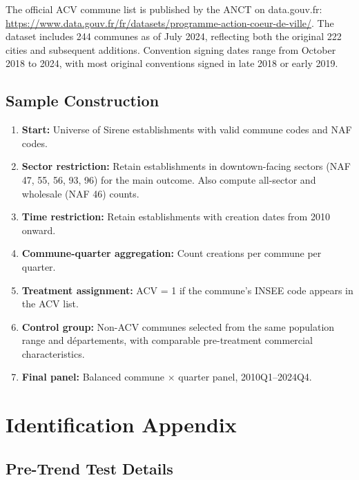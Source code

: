 \documentclass[12pt]{article}
\begin{document}
The official ACV commune list is published by the ANCT on data.gouv.fr: \url{https://www.data.gouv.fr/fr/datasets/programme-action-coeur-de-ville/}. The dataset includes 244 communes as of July 2024, reflecting both the original 222 cities and subsequent additions. Convention signing dates range from October 2018 to 2024, with most original conventions signed in late 2018 or early 2019.

\subsection{Sample Construction}

\begin{enumerate}
    \item \textbf{Start:} Universe of Sirene establishments with valid commune codes and NAF codes.
    \item \textbf{Sector restriction:} Retain establishments in downtown-facing sectors (NAF 47, 55, 56, 93, 96) for the main outcome. Also compute all-sector and wholesale (NAF 46) counts.
    \item \textbf{Time restriction:} Retain establishments with creation dates from 2010 onward.
    \item \textbf{Commune-quarter aggregation:} Count creations per commune per quarter.
    \item \textbf{Treatment assignment:} ACV = 1 if the commune's INSEE code appears in the ACV list.
    \item \textbf{Control group:} Non-ACV communes selected from the same population range and d\'epartements, with comparable pre-treatment commercial characteristics.
    \item \textbf{Final panel:} Balanced commune $\times$ quarter panel, 2010Q1--2024Q4.
\end{enumerate}

\section{Identification Appendix}
\label{app:identification}

\subsection{Pre-Trend Test Details}
\end{document}
